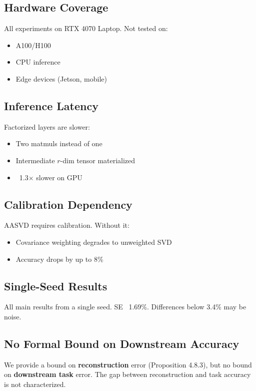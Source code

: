 \subsection{Hardware Coverage}

All experiments on RTX 4070 Laptop. Not tested on:
\begin{itemize}
\item A100/H100
\item CPU inference
\item Edge devices (Jetson, mobile)

\end{itemize}
\subsection{Inference Latency}

Factorized layers are slower:
\begin{itemize}
\item Two matmuls instead of one
\item Intermediate $r$-dim tensor materialized
\item ~1.3$\times$ slower on GPU

\end{itemize}
\subsection{Calibration Dependency}

AASVD requires calibration. Without it:
\begin{itemize}
\item Covariance weighting degrades to unweighted SVD
\item Accuracy drops by up to 8\%

\end{itemize}
\subsection{Single-Seed Results}

All main results from a single seed. SE ~1.69\%. Differences below 3.4\% 
may be noise.

\subsection{No Formal Bound on Downstream Accuracy}

We provide a bound on \textbf{reconstruction} error (Proposition 4.8.3), but 
no bound on \textbf{downstream task} error. The gap between reconstruction and 
task accuracy is not characterized.

